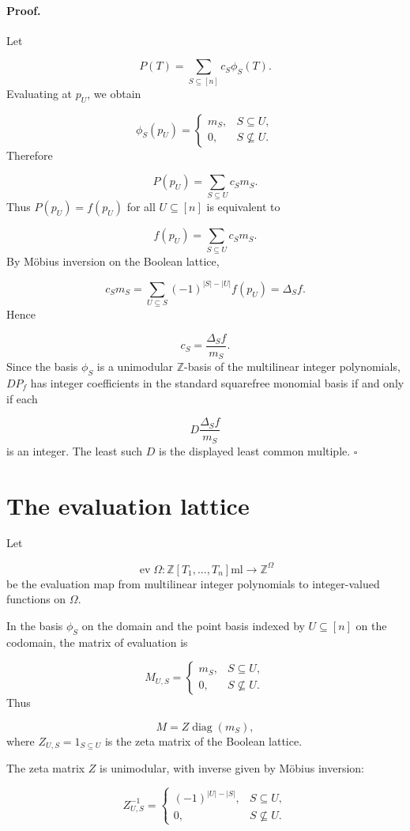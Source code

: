 \documentclass[11pt]{article}
\theoremstyle{definition}
\begin{document}
\paragraph{Proof.}
Let

\[
P(T)=\sum_{S\subseteq[n]}c_S\phi_S(T).
\]
Evaluating at $p_U$, we obtain

\[
\phi_S(p_U)
=
\begin{cases}
m_S,&S\subseteq U,\\
0,&S\nsubseteq U.
\end{cases}
\]
Therefore

\[
P(p_U)=\sum_{S\subseteq U}c_Sm_S.
\]
Thus $P(p_U)=f(p_U)$ for all $U\subseteq[n]$ is equivalent to

\[
f(p_U)=\sum_{S\subseteq U}c_Sm_S.
\]
By Möbius inversion on the Boolean lattice,

\[
c_Sm_S
=
\sum_{U\subseteq S}
(-1)^{|S|-|U|}f(p_U)
=
\Delta_S f.
\]
Hence

\[
c_S=\frac{\Delta_S f}{m_S}.
\]
Since the basis ${\phi_S}$ is a unimodular $\mathbb{Z}$-basis of the multilinear integer polynomials, $DP_f$ has integer coefficients in the standard squarefree monomial basis if and only if each

\[
D\frac{\Delta_S f}{m_S}
\]
is an integer. The least such $D$ is the displayed least common multiple. $\square$

\section{The evaluation lattice}
Let

\[
\operatorname{ev}\Omega:\mathbb{Z}[T_1,\dots,T_n]{\mathrm{ml}}\to\mathbb{Z}^\Omega
\]
be the evaluation map from multilinear integer polynomials to integer-valued functions on $\Omega$.

In the basis $\phi_S$ on the domain and the point basis indexed by $U\subseteq[n]$ on the codomain, the matrix of evaluation is

\[
M_{U,S}
=
\begin{cases}
m_S,&S\subseteq U,\\
0,&S\nsubseteq U.
\end{cases}
\]
Thus

\[
M=Z\operatorname{diag}(m_S),
\]
where $Z_{U,S}=1_{S\subseteq U}$ is the zeta matrix of the Boolean lattice.

The zeta matrix $Z$ is unimodular, with inverse given by Möbius inversion:

\[
Z^{-1}_{U,S}
=
\begin{cases}
(-1)^{|U|-|S|},&S\subseteq U,\\
0,&S\nsubseteq U.
\end{cases}
\]
\end{document}
